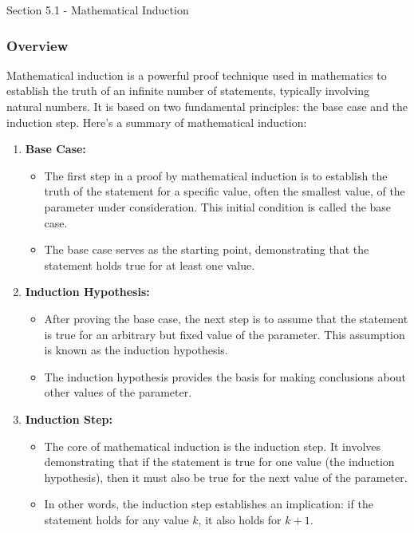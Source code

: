\begin{notes}{Section 5.1 - Mathematical Induction}
    \subsubsection*{Overview}

    Mathematical induction is a powerful proof technique used in mathematics to establish the truth of an infinite number of statements, typically involving natural numbers. It is based on two fundamental 
    principles: the base case and the induction step. Here's a summary of mathematical induction:

    \begin{enumerate}[label = \arabic*.]
        \item \textbf{Base Case:}
        \begin{itemize}
            \item The first step in a proof by mathematical induction is to establish the truth of the statement for a specific value, often the smallest value, of the parameter under consideration. 
            This initial condition is called the base case.
            \item The base case serves as the starting point, demonstrating that the statement holds true for at least one value.
        \end{itemize}
        \item \textbf{Induction Hypothesis:}
        \begin{itemize}
            \item After proving the base case, the next step is to assume that the statement is true for an arbitrary but fixed value of the parameter. This assumption is known as the induction hypothesis.
            \item The induction hypothesis provides the basis for making conclusions about other values of the parameter.
        \end{itemize}
        \item \textbf{Induction Step:}
        \begin{itemize}
            \item The core of mathematical induction is the induction step. It involves demonstrating that if the statement is true for one value (the induction hypothesis), then it must also be true 
            for the next value of the parameter.
            \item In other words, the induction step establishes an implication: if the statement holds for any value \(k\), it also holds for \(k + 1\).

\end{itemize}
\end{enumerate}
\end{notes}
